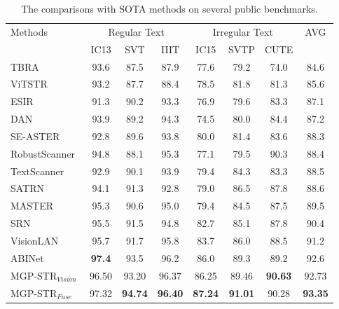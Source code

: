 \documentclass[runningheads]{llncs}
\newcommand{\ra}[1]{\renewcommand{\arraystretch}{#1}}
\begin{document}
\begin{table*}[t]
\setlength{\tabcolsep}{5pt}
\ra{1}
\centering
\caption{The comparisons with SOTA methods on several public benchmarks.}
\label{tab:sota}
\begin{tabular}{|l|c|c|c|c|c|c|c|}
\hline
\multirow{2}{*}{Methods}   &\multicolumn{3}{c|}{Regular Text} &\multicolumn{3}{c|}{Irregular Text} &\multirow{2}{*}{AVG}\\
\cline{2-7}
&IC13 &SVT  &IIIT   & IC15 & SVTP &CUTE &  \\
\hline
TBRA~\cite{deep}   &93.6 &87.5 &87.9 &77.6 &79.2  & 74.0  & 84.6 \\
ViTSTR~\cite{ViTSTR} &93.2 & 87.7 & 88.4 &78.5 &81.8 &81.3 &85.6 \\
ESIR~\cite{ESIR}   &91.3  &90.2 &93.3 &76.9 &79.6 &83.3  &  87.1  \\
DAN~\cite{DAN} &93.9  &89.2 &94.3  &74.5  &80.0 &84.4   &  87.2  \\
SE-ASTER~\cite{SEED}   &92.8 &89.6 &93.8 &80.0 &81.4 &83.6  & 88.3  \\
RobustScanner~\cite{RobustScanner}     & 94.8 & 88.1  & 95.3 & 77.1 & 79.5 &  90.3 & 88.4 \\
TextScanner~\cite{TextScanner} &92.9 &90.1 &93.9 &79.4 &84.3 &83.3  & 88.5 \\
SATRN~\cite{SATRN}    &94.1 &91.3 &92.8  &79.0 &86.5 &87.8 &  88.6 \\
MASTER~\cite{MASTER} &95.3	&90.6	&95.0	&79.4	&84.5	&87.5 & 89.5 \\
\hline
SRN~\cite{SRN}     & 95.5 & 91.5  & 94.8  &82.7  &85.1   &87.8 & 90.4 \\
VisionLAN~\cite{vlan} &95.7 &91.7& 95.8 &83.7 &86.0 &88.5 &91.2 \\
ABINet~\cite{ABInet}    &\textbf{97.4} &{93.5} &{96.2} &{86.0} &{89.3} &89.2  & {92.6} \\
\hline
MGP-STR$_{Vision}$  &96.50 &93.20 &{96.37} &86.25 &89.46 &\textbf{90.63} &92.73 \\
MGP-STR$_{Fuse}$  &{97.32}	&\textbf{94.74}	&\textbf{96.40}	&\textbf{87.24}	&\textbf{91.01}	&{90.28}	&\textbf{93.35} \\
\hline
\end{tabular}
\end{table*}
\end{document}
